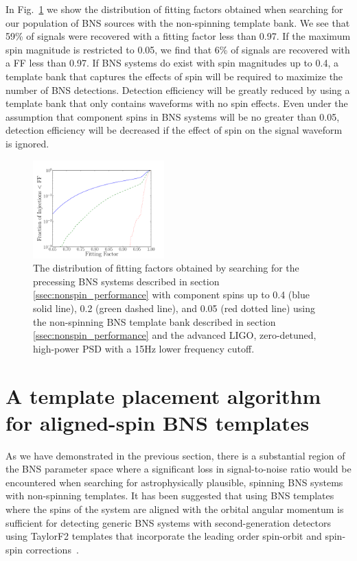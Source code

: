 In Fig.~\ref{fig:no_spin_cover} we show the distribution of fitting factors
obtained when searching for our population of BNS sources with the
non-spinning template bank. We see that 59\% of signals were recovered with a
fitting factor less than 0.97.  If the maximum spin magnitude is restricted to
0.05, we find that 6\% of signals are recovered with a FF less
than 0.97.  If BNS systems do exist with spin magnitudes up to 0.4, a template
bank that captures the effects of spin will be required to maximize the number
of BNS detections.  Detection efficiency will be greatly reduced by using a
template bank that only contains waveforms with no spin effects.  Even under
the assumption that component spins in BNS systems will be no greater
than 0.05, detection efficiency will be decreased if the effect of spin on the
signal waveform is ignored.

\begin{figure}
\includegraphics[width=0.45\textwidth]{papers/bns_spin/figure1.pdf}
\caption{\label{fig:no_spin_cover} The distribution of fitting factors obtained by searching
for the precessing BNS systems described in section \ref{ssec:nonspin_performance}
with component spins up to 0.4 (blue solid line), 0.2 (green dashed line), and 0.05 (red dotted line) using the non-spinning
BNS template bank described in section \ref{ssec:nonspin_performance} and the advanced LIGO, zero-detuned,
high-power PSD with a 15Hz lower frequency cutoff.}
\end{figure}

\section{A template placement algorithm for aligned-spin BNS templates}
\label{sec:param_space}

As we have demonstrated in the previous section, there is a substantial region
of the BNS parameter space where a significant loss in signal-to-noise ratio
would be encountered when searching for astrophysically plausible, spinning
BNS systems with non-spinning templates. It has been suggested that using BNS
templates where the spins of the system are aligned with the orbital angular
momentum is sufficient for detecting generic BNS systems with second-generation
detectors~\cite{Ajith:2011ec} using TaylorF2 templates that incorporate the
leading order spin-orbit and spin-spin corrections~\cite{PW95}. 

